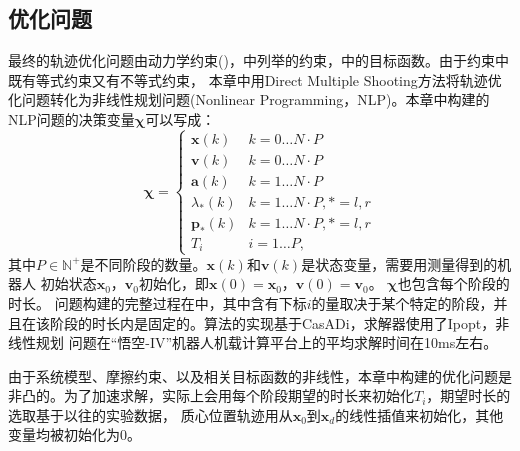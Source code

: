 \subsection{优化问题}
最终的轨迹优化问题由动力学约束()，中列举的约束，中的目标函数。由于约束中既有等式约束又有不等式约束，
本章中用Direct Multiple Shooting方法\cite{betts2010practical}将轨迹优化问题转化为非线性规划问题(Nonlinear Programming，NLP)。本章中构建的NLP问题的决策变量$\boldsymbol{\chi}$可以写成：
\begin{equation}
    \label{equ:decision_variable}
    \boldsymbol{\chi} = \begin{cases}\boldsymbol{x}(k) & k=0 \ldots N \cdot P \\ \boldsymbol{v}(k) & k=0 \ldots N \cdot P \\ \boldsymbol{a}(k) & k=1 \ldots N \cdot P \\ \lambda_*(k) & k=1 \ldots N \cdot P, *=l, r \\ \boldsymbol{p}_*(k) & k=1 \ldots N \cdot P, *=l, r \\ T_i & i=1 \ldots P,\end{cases}
\end{equation}
其中$P \in \mathbb{N}^+$是不同阶段的数量。$\boldsymbol{x}(k)$和$\boldsymbol{v}(k)$是状态变量，需要用测量得到的机器人
初始状态$\boldsymbol{x}_0$，$\boldsymbol{v}_0$初始化，即$\boldsymbol{x}(0)=\boldsymbol{x}_0$，$\boldsymbol{v}(0)=\boldsymbol{v}_0$。
$\boldsymbol{\chi}$也包含每个阶段的时长。
问题构建的完整过程在中，其中含有下标$i$的量取决于某个特定的阶段，并且在该阶段的时长内是固定的。算法的实现基于CasADi，求解器使用了Ipopt，非线性规划
问题在“悟空-IV”机器人机载计算平台上的平均求解时间在10ms左右。

由于系统模型、摩擦约束、以及相关目标函数的非线性，本章中构建的优化问题是非凸的。为了加速求解，实际上会用每个阶段期望的时长来初始化$T_i$，期望时长的选取基于以往的实验数据，
质心位置轨迹用从$\boldsymbol{x}_0$到$\boldsymbol{x}_d$的线性插值来初始化，其他变量均被初始化为0。
